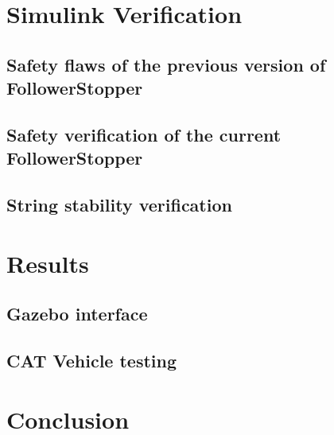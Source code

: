 \documentclass[conference]{IEEEtran}
\begin{document}



\section{Simulink Verification}

\subsection{Safety flaws of the previous version of FollowerStopper}

\subsection{Safety verification of the current FollowerStopper}

\subsection{String stability verification}






\section{Results}

\subsection{Gazebo interface}

\subsection{CAT Vehicle testing}






\section{Conclusion}
\end{document}
